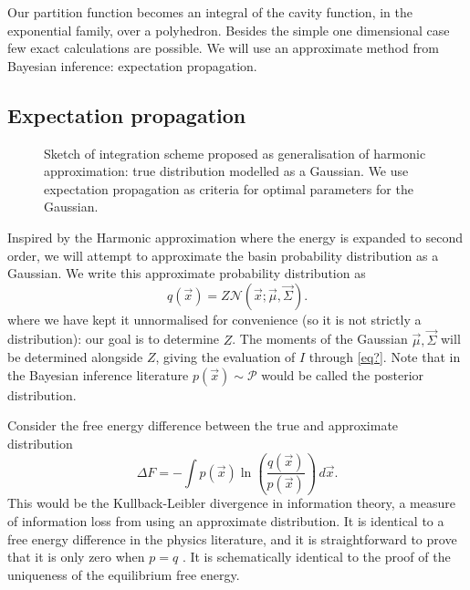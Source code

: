 \documentclass[11pt,twoside]{report}
\begin{document}
Our partition function becomes an integral of the cavity function, in the exponential family, over a polyhedron.
Besides the simple one dimensional case few exact calculations are possible.
We will use an approximate method from Bayesian inference: expectation propagation.

\subsection{Expectation propagation}

\begin{figure}
  \missingfigure[figwidth=\linewidth]{}
  \caption[Generalisation of harmonic approximation using machine learning]{
    Sketch of integration scheme proposed as generalisation of harmonic approximation: true distribution modelled as a Gaussian.
    We use expectation propagation as criteria for optimal parameters for the Gaussian.}
\end{figure}

Inspired by the Harmonic approximation where the energy is expanded to second order, we will attempt to approximate the basin probability distribution as a Gaussian.
We write this approximate probability distribution as
\begin{equation}
  q(\vec{x}) = Z \mathcal{N}(\vec{x}; \vec{\mu}, \vec{\Sigma}).
\end{equation}
where we have kept it unnormalised for convenience (so it is not strictly a distribution): our goal is to determine $Z$.
The moments of the Gaussian $\vec{\mu}, \vec{\Sigma}$ will be determined alongside $Z$, giving the evaluation of $I$ through \eqref{eq?}.
Note that in the Bayesian inference literature $p(\vec{x}) \sim \mathcal{P}$ would be called the posterior distribution.

Consider the free energy difference between the true and approximate distribution
\begin{equation}
  \Delta F
  =
  - \int p(\vec{x})
  \ln{\left( \frac{q(\vec{x})}{p(\vec{x})} \right)} \, d\vec{x}.
\end{equation}
This would be the Kullback-Leibler divergence in information theory, a measure of information loss from using an approximate distribution.
It is identical to a free energy difference in the physics literature, and it is straightforward to prove that it is only zero when $p = q$ \cite{MerminPR1965, EvansAP1979}.
It is schematically identical to the proof of the uniqueness of the equilibrium free energy.
\end{document}
